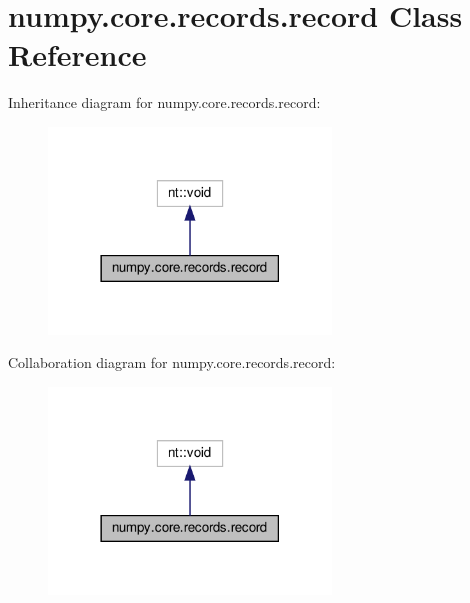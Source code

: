 \hypertarget{classnumpy_1_1core_1_1records_1_1record}{}\section{numpy.\+core.\+records.\+record Class Reference}
\label{classnumpy_1_1core_1_1records_1_1record}


Inheritance diagram for numpy.\+core.\+records.\+record\+:
\nopagebreak
\begin{figure}[H]
\begin{center}
\leavevmode
\includegraphics[width=213pt]{classnumpy_1_1core_1_1records_1_1record__inherit__graph}
\end{center}
\end{figure}


Collaboration diagram for numpy.\+core.\+records.\+record\+:
\nopagebreak
\begin{figure}[H]
\begin{center}
\leavevmode
\includegraphics[width=213pt]{classnumpy_1_1core_1_1records_1_1record__coll__graph}
\end{center}
\end{figure}
